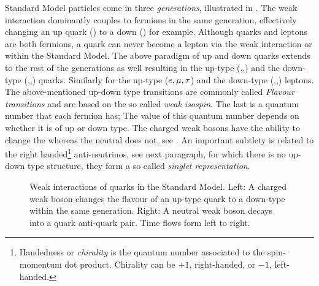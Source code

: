 Standard Model particles come in three {\it generations}, illustrated in .
The weak interaction dominantly couples to fermions in the same generation, effectively changing an up quark (\uquark) to a down (\dquark) for example.
Although quarks and leptons are both fermions, a quark can never become a lepton via the weak interaction or \viceversa within the Standard Model.
The above paradigm of up and down quarks extends to the rest of the generations as well resulting in the up-type (\uquark,\cquark,\tquark)
and the down-type (\dquark,\squark,\bquark) quarks. Similarly for the  up-type ($e,\mu,\tau$) and the down-type (\neue,\neum,\neut)
leptons. The above-mentioned up-down type transitions are commonly called {\it Flavour transitions} and are based on the so called
{\it weak isospin}. The last is a quantum number that each fermion has; The value of this quantum number depends on whether it is of up or down type.
The charged weak bosons \Wpm have the ability to change the whereas the neutral \Z  does not, see .
An important subtlety is related to the right handed\footnote{Handedness or {\it chirality} is the quantum number associated to the
spin-momentum dot product. Chirality can be $+1$, right-handed, or $-1$, left-handed. } anti-neutrinos, see next paragraph,
for which there is no up-down type structure, \ie they form a so called {\it singlet representation}.

\begin{figure}[h!]
  \centering
  {\sffamily }
  \caption{Weak interactions of quarks in the Standard Model. Left: A charged weak boson changes the flavour
           of an up-type quark to a down-type within the same generation.
           Right: A neutral weak boson decays into a quark anti-quark pair. Time flows form left to right.}
  \label{WeakInteractions}
\end{figure}

